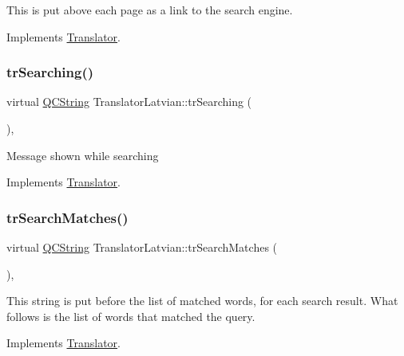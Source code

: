This is put above each page as a link to the search engine. 

Implements \mbox{\hyperlink{class_translator}{Translator}}.

\mbox{\label{class_translator_latvian_af4941a5011eeaf8e581f9861d892d6fa}} 
\subsubsection{\texorpdfstring{trSearching()}{trSearching()}}
{\footnotesize\ttfamily virtual \mbox{\hyperlink{class_q_c_string}{Q\+C\+String}} Translator\+Latvian\+::tr\+Searching (\begin{DoxyParamCaption}{ }\end{DoxyParamCaption})\hspace{0.3cm}{\ttfamily [inline]}, {\ttfamily [virtual]}}

Message shown while searching 

Implements \mbox{\hyperlink{class_translator}{Translator}}.

\mbox{\label{class_translator_latvian_a3856fb5d3cb295c5f0840cfbaf5a78c6}} 
\subsubsection{\texorpdfstring{trSearchMatches()}{trSearchMatches()}}
{\footnotesize\ttfamily virtual \mbox{\hyperlink{class_q_c_string}{Q\+C\+String}} Translator\+Latvian\+::tr\+Search\+Matches (\begin{DoxyParamCaption}{ }\end{DoxyParamCaption})\hspace{0.3cm}{\ttfamily [inline]}, {\ttfamily [virtual]}}

This string is put before the list of matched words, for each search result. What follows is the list of words that matched the query. 

Implements \mbox{\hyperlink{class_translator}{Translator}}.

\mbox{\label{class_translator_latvian_a61933ec05bfbd11cda84ba671163515c}} 
